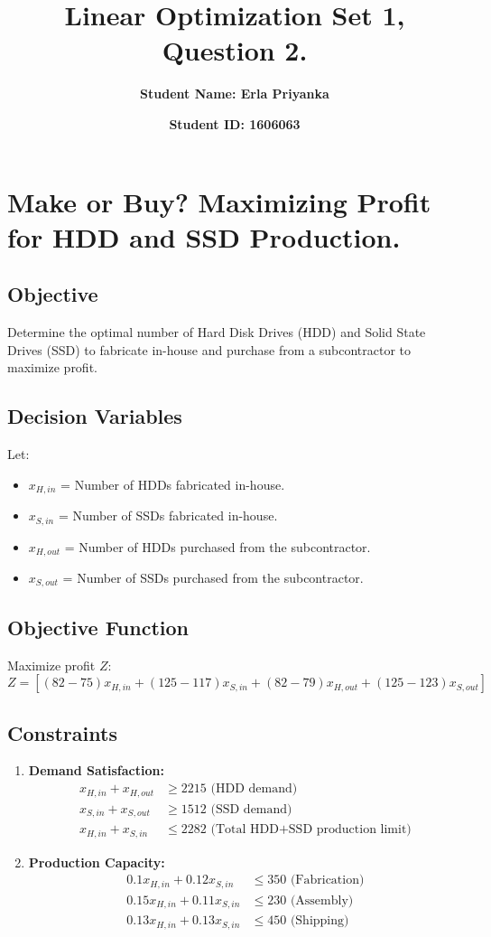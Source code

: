 \documentclass[10pt]{article}
\title{\textbf{Linear Optimization Set 1, Question 2.}}
\author{\textbf{Student Name: Erla Priyanka}}
\date{\textbf{Student ID: 1606063}}
\begin{document}
\maketitle


\section*{ Make or Buy? Maximizing Profit for HDD and SSD Production.}

\subsection*{Objective}
Determine the optimal number of Hard Disk Drives (HDD) and Solid State Drives (SSD) to fabricate in-house and purchase from a subcontractor to maximize profit.

\subsection*{Decision Variables}
Let:
\begin{itemize}
    \item \( x_{H,in} \) = Number of HDDs fabricated in-house.
    \item \( x_{S,in} \) = Number of SSDs fabricated in-house.
    \item \( x_{H,out} \) = Number of HDDs purchased from the subcontractor.
    \item \( x_{S,out} \) = Number of SSDs purchased from the subcontractor.
\end{itemize}

\subsection*{Objective Function}
Maximize profit \( Z \):
\[
Z = [(82 - 75)x_{H,in} + (125 - 117)x_{S,in} + (82 - 79)x_{H,out} + (125 - 123)x_{S,out}]
\]

\subsection*{Constraints}

\begin{enumerate}
    \item \textbf{Demand Satisfaction:}
    \begin{align*}
    x_{H,in} + x_{H,out} &\geq 2215 \text{ (HDD demand)} \\
    x_{S,in} + x_{S,out} &\geq 1512 \text{ (SSD demand)} \\
    x_{H,in} + x_{S,in} &\leq 2282 \text{ (Total HDD+SSD production limit)}
    \end{align*}

    \item \textbf{Production Capacity:}
    \begin{align*}
    0.1x_{H,in} + 0.12x_{S,in} &\leq 350 \text{ (Fabrication)} \\
    0.15x_{H,in} + 0.11x_{S,in} &\leq 230 \text{ (Assembly)} \\
    0.13x_{H,in} + 0.13x_{S,in} &\leq 450 \text{ (Shipping)}
    \end{align*}
\end{enumerate}
\end{document}
